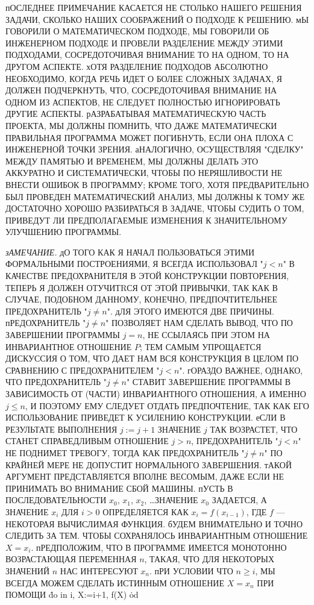 пОСЛЕДНЕЕ ПРИМЕЧАНИЕ КАСАЕТСЯ НЕ СТОЛЬКО НАШЕГО РЕШЕНИЯ
ЗАДАЧИ, СКОЛЬКО НАШИХ СООБРАЖЕНИЙ О ПОДХОДЕ К РЕШЕНИЮ.
мЫ ГОВОРИЛИ О МАТЕМАТИЧЕСКОМ ПОДХОДЕ, МЫ ГОВОРИЛИ ОБ
ИНЖЕНЕРНОМ ПОДХОДЕ И ПРОВЕЛИ РАЗДЕЛЕНИЕ МЕЖДУ ЭТИМИ ПОДХОДАМИ,
СОСРЕДОТОЧИВАЯ ВНИМАНИЕ ТО НА ОДНОМ, ТО НА ДРУГОМ АСПЕКТЕ.
хОТЯ РАЗДЕЛЕНИЕ ПОДХОДОВ АБСОЛЮТНО НЕОБХОДИМО,
КОГДА РЕЧЬ ИДЕТ О БОЛЕЕ СЛОЖНЫХ ЗАДАЧАХ, Я ДОЛЖЕН ПОДЧЕРКНУТЬ,
ЧТО, СОСРЕДОТОЧИВАЯ ВНИМАНИЕ НА ОДНОМ ИЗ АСПЕКТОВ, НЕ
СЛЕДУЕТ ПОЛНОСТЬЮ ИГНОРИРОВАТЬ ДРУГИЕ АСПЕКТЫ. рАЗРАБАТЫВАЯ
МАТЕМАТИЧЕСКУЮ ЧАСТЬ ПРОЕКТА, МЫ ДОЛЖНЫ ПОМНИТЬ, ЧТО ДАЖЕ
МАТЕМАТИЧЕСКИ ПРАВИЛЬНАЯ ПРОГРАММА МОЖЕТ ПОГИБНУТЬ,
ЕСЛИ ОНА ПЛОХА С ИНЖЕНЕРНОЙ ТОЧКИ ЗРЕНИЯ. аНАЛОГИЧНО, ОСУЩЕСТВЛЯЯ
"СДЕЛКУ" МЕЖДУ ПАМЯТЬЮ И ВРЕМЕНЕМ, МЫ ДОЛЖНЫ ДЕЛАТЬ
ЭТО АККУРАТНО И СИСТЕМАТИЧЕСКИ, ЧТОБЫ ПО НЕРЯШЛИВОСТИ
НЕ ВНЕСТИ ОШИБОК В ПРОГРАММУ; КРОМЕ ТОГО, ХОТЯ ПРЕДВАРИТЕЛЬНО
БЫЛ ПРОВЕДЕН МАТЕМАТИЧЕСКИЙ АНАЛИЗ, МЫ ДОЛЖНЫ
К ТОМУ ЖЕ ДОСТАТОЧНО ХОРОШО РАЗБИРАТЬСЯ В ЗАДАЧЕ, ЧТОБЫ
СУДИТЬ О ТОМ, ПРИВЕДУТ ЛИ ПРЕДПОЛАГАЕМЫЕ ИЗМЕНЕНИЯ К ЗНАЧИТЕЛЬНОМУ
УЛУЧШЕНИЮ ПРОГРАММЫ.

{\sl зАМЕЧАНИЕ.} дО ТОГО КАК Я НАЧАЛ ПОЛЬЗОВАТЬСЯ ЭТИМИ ФОРМАЛЬНЫМИ
ПОСТРОЕНИЯМИ, Я ВСЕГДА ИСПОЛЬЗОВАЛ "$j<n$" В КАЧЕСТВЕ 
ПРЕДОХРАНИТЕЛЯ В ЭТОЙ КОНСТРУКЦИИ ПОВТОРЕНИЯ, ТЕПЕРЬ Я
ДОЛЖЕН ОТУЧИТRСЯ ОТ ЭТОЙ ПРИВЫЧКИ, ТАК КАК В СЛУЧАЕ, ПОДОБНОМ
ДАННОМУ, КОНЕЧНО, ПРЕДПОЧТИТЕЛЬНЕЕ ПРЕДОХРАНИТЕЛЬ "$j\not= n$".
дЛЯ ЭТОГО ИМЕЮТСЯ ДВЕ ПРИЧИНЫ. пРЕДОХРАНИТЕЛЬ "$j\not=n$"
ПОЗВОЛЯЕТ НАМ СДЕЛАТЬ ВЫВОД, ЧТО ПО ЗАВЕРШЕНИИ ПРОГРАММЫ 
$j=n$, НЕ ССЫЛАЯСЬ ПРИ ЭТОМ НА ИНВАРИАНТНОЕ ОТНОШЕНИЕ $P$;
ТЕМ САМЫМ УПРОЩАЕТСЯ ДИСКУССИЯ О ТОМ, ЧТО ДАЕТ НАМ
ВСЯ КОНСТРУКЦИЯ В ЦЕЛОМ ПО СРАВНЕНИЮ С ПРЕДОХРАНИТЕЛЕМ "$j<n$".
гОРАЗДО ВАЖНЕЕ, ОДНАКО, ЧТО ПРЕДОХРАНИТЕЛЬ "$j\not=n$"
СТАВИТ ЗАВЕРШЕНИЕ ПРОГРАММЫ В ЗАВИСИМОСТЬ ОТ (ЧАСТИ) ИНВАРИАНТНОГО
ОТНОШЕНИЯ, А ИМЕННО $j\le n$, И ПОЭТОМУ ЕМУ СЛЕДУЕТ
ОТДАТЬ ПРЕДПОЧТЕНИЕ, ТАК КАК ЕГО ИСПОЛЬЗОВАНИЕ ПРИВЕДЕТ К
УСИЛЕНИЮ КОНСТРУКЦИИ. еСЛИ В РЕЗУЛЬТАТЕ ВЫПОЛНЕНИЯ $j:=j+1$
ЗНАЧЕНИЕ $j$ ТАК ВОЗРАСТЕТ, ЧТО СТАНЕТ СПРАВЕДЛИВЫМ ОТНОШЕНИЕ
$j>n$, ПРЕДОХРАНИТЕЛЬ "$j<n$" НЕ ПОДНИМЕТ ТРЕВОГУ, ТОГДА
КАК ПРЕДОХРАНИТЕЛЬ "$j\not=n$" ПО КРАЙНЕЙ МЕРЕ НЕ ДОПУСТИТ
НОРМАЛЬНОГО ЗАВЕРШЕНИЯ. тАКОЙ АРГУМЕНТ ПРЕДСТАВЛЯЕТСЯ ВПОЛНЕ
ВЕСОМЫМ, ДАЖЕ ЕСЛИ НЕ ПРИНИМАТЬ ВО ВНИМАНИЕ СБОЙ МАШИНЫ.
пУСТЬ В ПОСЛЕДОВАТЕЛЬНОСТИ $x_0$, $x_1$, $x_2$, \dots ЗНАЧЕНИЕ $x_0$ ЗАДАЕТСЯ,
А ЗНАЧЕНИЕ $x_i$ ДЛЯ $i>0$ ОПРЕДЕЛЯЕТСЯ КАК $x_i=f(x_{i-1})$, ГДЕ $f$ ---
НЕКОТОРАЯ ВЫЧИСЛИМАЯ ФУНКЦИЯ. бУДЕМ ВНИМАТЕЛЬНО И ТОЧНО
СЛЕДИТЬ ЗА ТЕМ. ЧТОБЫ СОХРАНЯЛОСЬ ИНВАРИАНТНЫМ ОТНОШЕНИЕ
$X=x_i$. пРЕДПОЛОЖИМ, ЧТО В ПРОГРАММЕ ИМЕЕТСЯ МОНОТОННО
ВОЗРАСТАЮЩАЯ ПЕРЕМЕННАЯ $n$, ТАКАЯ, ЧТО ДЛЯ НЕКОТОРЫХ 
ЗНАЧЕНИЙ $n$ НАС ИНТЕРЕСУЮТ $x_n$. пРИ УСЛОВИИ ЧТО $n\ge i$, МЫ ВСЕГДА
МОЖЕМ СДЕЛАТЬ ИСТИННЫМ ОТНОШЕНИЕ $X=x_n$ ПРИ ПОМОЩИ
\prg
\.{do} i\NE n \TO i, X:=i+1, f(X) \.{od}
\grp

